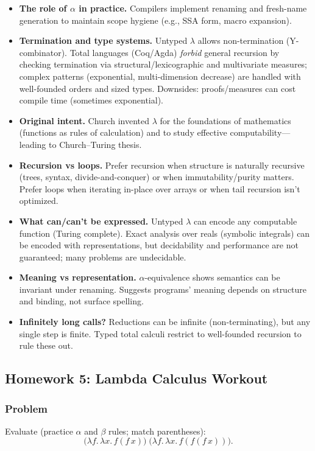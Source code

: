 \documentclass{article}
\theoremstyle{theorem}
\theoremstyle{definition}
\theoremstyle{remark}
\begin{document}
\begin{itemize}
  \item \textbf{The role of $\alpha$ in practice.} Compilers implement renaming and fresh-name generation to maintain scope hygiene (e.g., SSA form, macro expansion).
  \item \textbf{Termination and type systems.} Untyped $\lambda$ allows non-termination (Y-combinator). Total languages (Coq/Agda) \emph{forbid} general recursion by checking termination via structural/lexicographic and multivariate measures; complex patterns (exponential, multi-dimension decrease) are handled with well-founded orders and sized types. Downsides: proofs/measures can cost compile time (sometimes exponential).
  \item \textbf{Original intent.} Church invented $\lambda$ for the foundations of mathematics (functions as rules of calculation) and to study effective computability—leading to Church–Turing thesis.
  \item \textbf{Recursion vs loops.} Prefer recursion when structure is naturally recursive (trees, syntax, divide-and-conquer) or when immutability/purity matters. Prefer loops when iterating in-place over arrays or when tail recursion isn’t optimized.
  \item \textbf{What can/can’t be expressed.} Untyped $\lambda$ can encode any computable function (Turing complete). Exact analysis over reals (symbolic integrals) can be encoded with representations, but decidability and performance are not guaranteed; many problems are undecidable.
  \item \textbf{Meaning vs representation.} $\alpha$-equivalence shows semantics can be invariant under renaming. Suggests programs’ meaning depends on structure and binding, not surface spelling.
  \item \textbf{Infinitely long calls?} Reductions can be infinite (non-terminating), but any single step is finite. Typed total calculi restrict to well-founded recursion to rule these out.
\end{itemize}

\subsection{Homework 5: Lambda Calculus Workout}

\subsubsection*{Problem}
Evaluate (practice $\alpha$ and $\beta$ rules; match parentheses):
\[
\Big(\lambda f.\,\lambda x.\,f(f\,x)\Big)\;
\Big(\lambda f.\,\lambda x.\,f(f(f\,x))\Big).
\]
\end{document}
